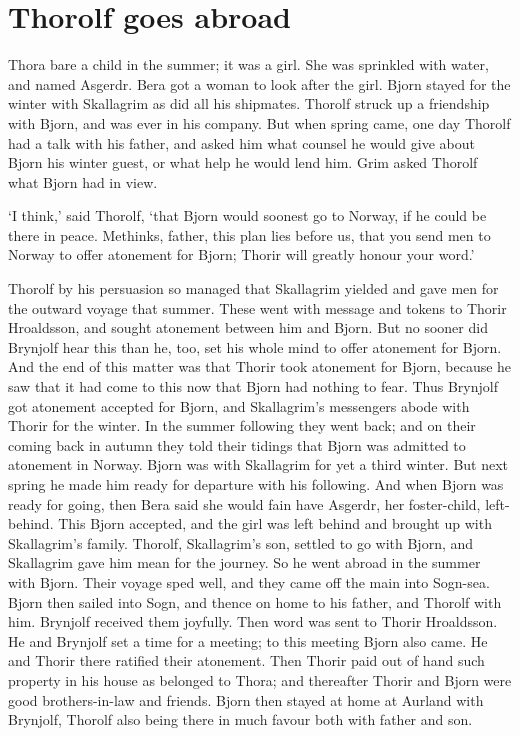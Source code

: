 \chapter{Thorolf goes abroad}

Thora bare a child in the summer; it was a girl. She was sprinkled with water, and named Asgerdr. Bera got a woman to look after the girl. Bjorn stayed for the winter with Skallagrim as did all his shipmates. Thorolf struck up a friendship with Bjorn, and was ever in his company. But when spring came, one day Thorolf had a talk with his father, and asked him what counsel he would give about Bjorn his winter guest, or what help he would lend him. Grim asked Thorolf what Bjorn had in view.

`I think,' said Thorolf, `that Bjorn would soonest go to Norway, if he could be there in peace. Methinks, father, this plan lies before us, that you send men to Norway to offer atonement for Bjorn; Thorir will greatly honour your word.'

Thorolf by his persuasion so managed that Skallagrim yielded and gave men for the outward voyage that summer. These went with message and tokens to Thorir Hroaldsson, and sought atonement between him and Bjorn. But no sooner did Brynjolf hear this than he, too, set his whole mind to offer atonement for Bjorn. And the end of this matter was that Thorir took atonement for Bjorn, because he saw that it had come to this now that Bjorn had nothing to fear. Thus Brynjolf got atonement accepted for Bjorn, and Skallagrim's messengers abode with Thorir for the winter. In the summer following they went back; and on their coming back in autumn they told their tidings that Bjorn was admitted to atonement in Norway. Bjorn was with Skallagrim for yet a third winter. But next spring he made him ready for departure with his following. And when Bjorn was ready for going, then Bera said she would fain have Asgerdr, her foster-child, left-behind. This Bjorn accepted, and the girl was left behind and brought up with Skallagrim's family. Thorolf, Skallagrim's son, settled to go with Bjorn, and Skallagrim gave him mean for the journey. So he went abroad in the summer with Bjorn. Their voyage sped well, and they came off the main into Sogn-sea. Bjorn then sailed into Sogn, and thence on home to his father, and Thorolf with him. Brynjolf received them joyfully. Then word was sent to Thorir Hroaldsson. He and Brynjolf set a time for a meeting; to this meeting Bjorn also came. He and Thorir there ratified their atonement. Then Thorir paid out of hand such property in his house as belonged to Thora; and thereafter Thorir and Bjorn were good brothers-in-law and friends. Bjorn then stayed at home at Aurland with Brynjolf, Thorolf also being there in much favour both with father and son.
